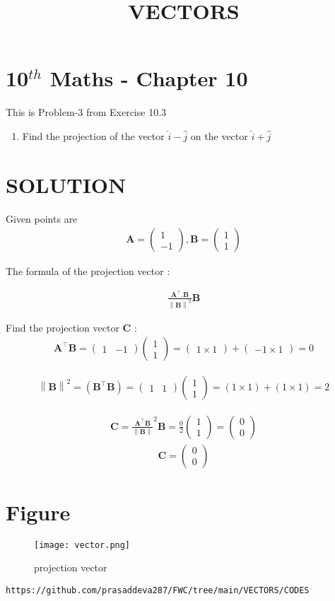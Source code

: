 \documentclass[12pt]{article}
\newcommand{\myvec}[1]{\ensuremath{\begin{pmatrix}#1\end{pmatrix}}}
\providecommand{\norm}[1]{\left\lVert#1\right\rVert}
\let\vec\mathbf
\begin{document}
\begin{center}
\title{\textbf{VECTORS}}
\date{\vspace{-5ex}} %
\maketitle
\end{center}

\setcounter{page}{1}

\section{10$^{th}$ Maths - Chapter 10}

This is Problem-3 from Exercise 10.3

\begin{enumerate}
\item Find the projection of the vector $\hat{i}-\hat{j}$ on the vector $\hat{i}+\hat{j}$  
\end{enumerate}
\section{SOLUTION}
Given points are
\begin{align}
 \vec{A}=\myvec{1\\ -1} ,
 \vec{B}=\myvec{1\\ 1}
\end{align}

The formula of the projection vector :
 
\begin{align}
	\frac{\vec{A}^\top.\vec{B}}{\norm{\vec{B}}^2} \vec{B}
\end{align}

Find the projection vector $\vec{C}$ :
\begin{align}
	\vec{A}^\top \vec{B} = \myvec{1 &-1} \myvec{1\\ 1}=\myvec{1 \times 1}+\myvec{-1 \times  1}=0
\end{align}

\begin{align}
	\norm {\vec {B}}^2 = (\vec{B}^\top  \vec{B})=\myvec{1 & 1} \myvec{1\\ 1}= (1 \times  1)+(1 \times  1)=2
\end{align}

\begin{align}
\vec{C} = 
	\frac{\vec{A}^\top  \vec{B}}{\norm {\vec{B}}}^2 \vec{B}
   =\frac{0}{2} \myvec{1\\ 1}
	=\myvec{0\\ 0}
\end{align}
\begin{align}
	\vec{C}=\myvec{0\\ 0}
\end{align}

\pagebreak\section{Figure}
\begin{figure}[h]
\texttt{[image: vector.png]}
\caption{projection vector}
		\label{fig:Figure}
\end{figure}
\begin{lstlisting}
https://github.com/prasaddeva287/FWC/tree/main/VECTORS/CODES
\end{lstlisting}
\end{document}
